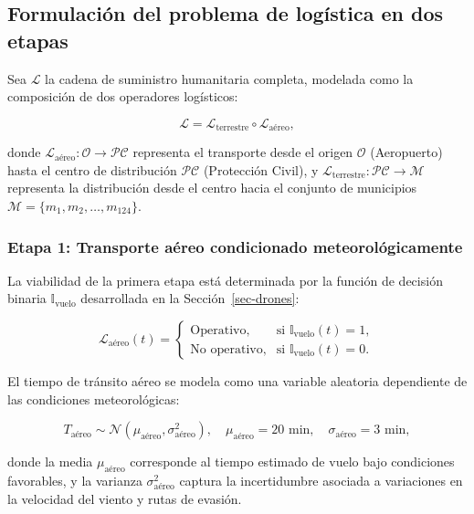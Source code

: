 \documentclass[
  spanish,
  us-letterpaper,
]{scrreprt}
\numberwithin{equation}{section}
\begin{document}
\subsection{Formulación del problema de logística en dos
etapas}\label{formulaciuxf3n-del-problema-de-loguxedstica-en-dos-etapas}

Sea \(\mathcal{L}\) la cadena de suministro humanitaria completa,
modelada como la composición de dos operadores logísticos:

\[
\mathcal{L} = \mathcal{L}_{\text{terrestre}} \circ \mathcal{L}_{\text{aéreo}},
\]

donde \(\mathcal{L}_{\text{aéreo}}: \mathcal{O} \to \mathcal{PC}\)
representa el transporte desde el origen \(\mathcal{O}\) (Aeropuerto)
hasta el centro de distribución \(\mathcal{PC}\) (Protección Civil), y
\(\mathcal{L}_{\text{terrestre}}: \mathcal{PC} \to \mathcal{M}\)
representa la distribución desde el centro hacia el conjunto de
municipios \(\mathcal{M} = \{m_1, m_2, \dots, m_{124}\}\).

\subsubsection{Etapa 1: Transporte aéreo condicionado
meteorológicamente}\label{etapa-1-transporte-auxe9reo-condicionado-meteoroluxf3gicamente}

La viabilidad de la primera etapa está determinada por la función de
decisión binaria \(\mathbb{I}_{\text{vuelo}}\) desarrollada en la
Sección~\ref{sec-drones}:

\[
\mathcal{L}_{\text{aéreo}}(t) = 
\begin{cases}
\text{Operativo}, & \text{si } \mathbb{I}_{\text{vuelo}}(t) = 1, \\
\text{No operativo}, & \text{si } \mathbb{I}_{\text{vuelo}}(t) = 0.
\end{cases}
\]

El tiempo de tránsito aéreo se modela como una variable aleatoria
dependiente de las condiciones meteorológicas:

\[
T_{\text{aéreo}} \sim \mathcal{N}\left(\mu_{\text{aéreo}}, \sigma_{\text{aéreo}}^2\right), \quad \mu_{\text{aéreo}} = 20 \text{ min}, \quad \sigma_{\text{aéreo}} = 3 \text{ min},
\]

donde la media \(\mu_{\text{aéreo}}\) corresponde al tiempo estimado de
vuelo bajo condiciones favorables, y la varianza
\(\sigma_{\text{aéreo}}^2\) captura la incertidumbre asociada a
variaciones en la velocidad del viento y rutas de evasión.
\end{document}
